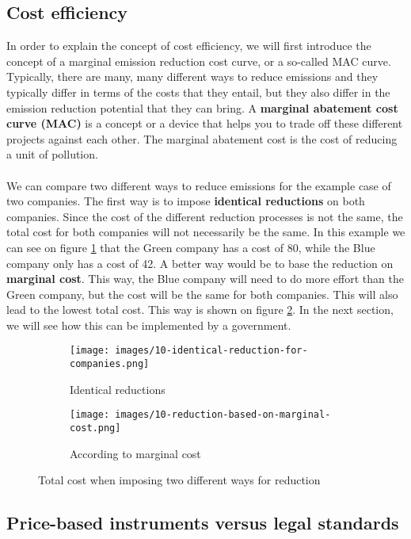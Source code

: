 \documentclass[../summary.tex]{subfiles}
\begin{document}
\subsection{Cost efficiency}
In order to explain the concept of cost efficiency, we will first introduce the concept of a marginal emission reduction cost curve, or a so-called MAC curve. Typically, there are many, many different ways to reduce emissions and they typically differ in terms of the costs that they entail, but they also differ in the emission reduction potential that they can bring. A \textbf{marginal abatement cost curve (MAC)} is a concept or a device that helps you to trade off these different projects against each other. The marginal abatement cost is the cost of reducing a unit of pollution.
\\\\
We can compare two different ways to reduce emissions for the example case of two companies. The first way is to impose \textbf{identical reductions} on both companies. Since the cost of the different reduction processes is not the same, the total cost for both companies will not necessarily be the same. In this example we can see on figure \ref{fig:reduction-identical} that the Green company has a cost of 80, while the Blue company only has a cost of 42. A better way would be to base the reduction on \textbf{marginal cost}. This way, the Blue company will need to do more effort than the Green company, but the cost will be the same for both companies. This will also lead to the lowest total cost. This way is shown on figure \ref{fig:reduction-marginal-cost}. In the next section, we will see how this can be implemented by a government.

\begin{figure}[htbp]
	\centering
	\begin{subfigure}{.5\textwidth}
		\centering
		\texttt{[image: images/10-identical-reduction-for-companies.png]}
		\caption{Identical reductions}
		\label{fig:reduction-identical}
	\end{subfigure}%
	\begin{subfigure}{.5\textwidth}
		\centering
		\texttt{[image: images/10-reduction-based-on-marginal-cost.png]}
		\caption{According to marginal cost}
		\label{fig:reduction-marginal-cost}
	\end{subfigure}
	\caption{Total cost when imposing two different ways for reduction}
	\label{fig:reduction}
\end{figure}
\newpage
\subsection{Price-based instruments versus legal standards}
\end{document}
